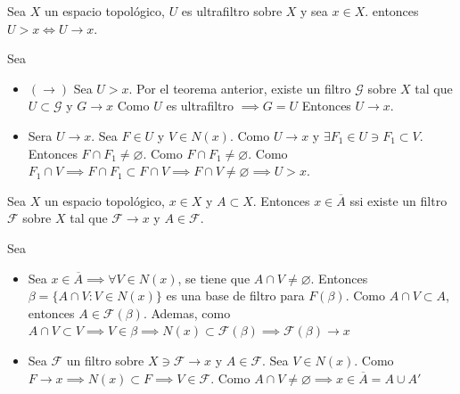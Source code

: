 \begin{teorema}
    Sea $X$ un espacio topológico, $U$ es ultrafiltro sobre $X$ y sea $x\in X$. entonces $U>x\iff U\to x$. 
    \begin{dem}
        Sea 
        \begin{itemize}
            \item $(\to)$ Sea $U>x$. Por el teorema anterior, existe un filtro $\mathcal{G}$ sobre $X$ tal que $U\subset \mathcal{G}$ y $G\to x$ Como $U$ es ultrafiltro $\implies G=U$ Entonces $U\to x$. 
            \item Sera $U\to x$. Sea $F\in U$ y $V\in N(x)$. Como $U\to x$ y $\exists F_1\in U\ni F_1\subset V$. Entonces $F\cap F_1\neq \varnothing$. Como $F\cap F_1\neq \varnothing$. Como $F_1\cap V\implies F\cap F_1\subset F\cap V\implies F\cap V\neq \varnothing\implies U>x$. 
        \end{itemize}
    \end{dem}
\end{teorema}

\begin{teorema}
    Sea $X$ un espacio topológico, $x\in X$ y $A\subset X$. Entonces $x\in \overline{A}$ ssi existe un filtro $\mathcal{F}$ sobre $X$ tal que $\mathcal{F}\to x$ y $A\in \mathcal{F}$. 
    \begin{dem}
        Sea 
        \begin{itemize}
            \item Sea $x\in \overline{A}\implies \forall V\in N(x)$, se tiene que $A\cap V\neq \varnothing$. Entonces $\beta= \{A\cap V: V\in N(x)\}$ es una base de filtro para $F(\beta)$. Como $A\cap V\subset A$, entonces $A\in \mathcal{F}(\beta)$. Ademas, como $A\cap V\subset V\implies V \in \mathcal{\beta}\implies N(x)\subset \mathcal{F}(\beta)\implies \mathcal{F}(\beta)\to x$ 
            \item Sea $\mathcal{F}$ un filtro sobre $X\ni \mathcal{F}\to x$ y $A\in \mathcal{F}$. Sea $V\in N(x)$. Como $F\to x\implies N(x)\subset F\implies V\in \mathcal{F}$. Como $A\cap V\neq \varnothing\implies x\in \overline{A}=A\cup A'$
        \end{itemize}
    \end{dem}
\end{teorema}

